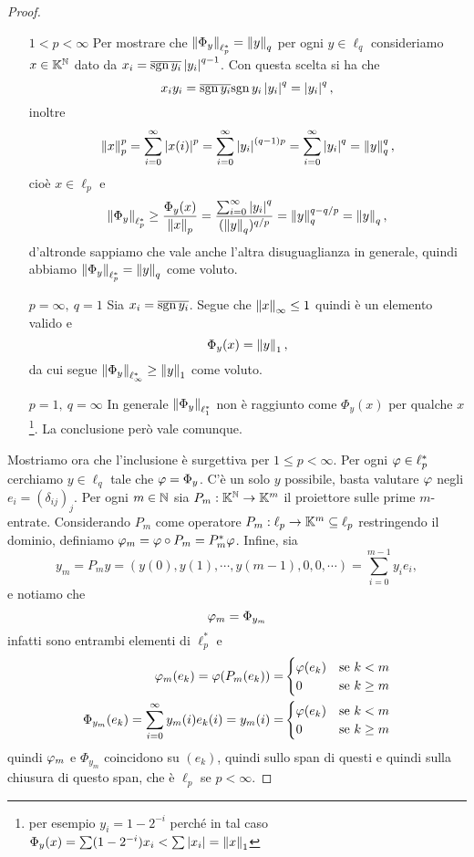 \begin{proof}
\setlength{\leftmargini}{0cm}
\begin{itemize}
\item[$\boxed{1< p<\infty}$] Per mostrare che $\left\Vert{\Phi_y}\right\Vert_{\ell_p^\ast}=\left\Vert{y}\right\Vert_q$ per ogni $y\in \ell_q$ consideriamo $x\in\mathbb{K}^{\mathbb{N}}$ dato da $x_i=\overline{\operatorname{sgn} y_i}\left|{y_i}\right|^{q-1}$. Con questa scelta si ha che
\[x_iy_i=\overline{\operatorname{sgn} y_i}{\operatorname{sgn} y_i}\left|{y_i}\right|^q=\left|{y_i}\right|^q,\]
inoltre
\[\left\Vert{x}\right\Vert_p^p=\sum_{i=0}^\infty \left|{x(i)}\right|^p=\sum_{i=0}^\infty \left|{y_i}\right|^{(q-1)p}=\sum_{i=0}^\infty \left|{y_i}\right|^{q}=\left\Vert{y}\right\Vert_q^q,\]
cio\`e $x\in \ell_p$ e 
\[\left\Vert{\Phi_y}\right\Vert_{\ell_p^\ast}\geq \frac{\Phi_y(x)}{\left\Vert{x}\right\Vert_p}=\frac{\sum_{i=0}^\infty \left|{y_i}\right|^q}{(\left\Vert{y}\right\Vert_q)^{q/p}}=\left\Vert{y}\right\Vert_q^{q-q/p}=\left\Vert{y}\right\Vert_q,\]
d'altronde sappiamo che vale anche l'altra disuguaglianza in generale, quindi abbiamo $\left\Vert{\Phi_y}\right\Vert_{\ell_p^\ast}=\left\Vert{y}\right\Vert_q$ come voluto.
\item[$\boxed{p=\infty,\ q=1}$] Sia $x_i=\overline{\operatorname{sgn} y_i}$. Segue che $\left\Vert{x}\right\Vert_\infty\leq 1$ quindi \`e un elemento valido e
\[\Phi_y(x)=\left\Vert{y}\right\Vert_1,\]
da cui segue $\left\Vert{\Phi_y}\right\Vert_{\ell_\infty^\ast}\geq \left\Vert{y}\right\Vert_1$ come voluto.
\item[$\boxed{p=1,\ q=\infty}$] In generale $\left\Vert{\Phi_y}\right\Vert_{\ell_1^\ast}$ non \`e raggiunto come $\Phi_y(x)$ per qualche $x$ \footnote{per esempio $y_i=1-2^{-i}$ perch\'e in tal caso $\Phi_y(x)=\sum (1-2^{-i})x_i<\sum \left|{x_i}\right|=\left\Vert{x}\right\Vert_1$}. La conclusione per\`o vale comunque.
\end{itemize}
Mostriamo ora che l'inclusione \`e surgettiva per $1\leq p<\infty$. Per ogni $\varphi\in \ell_p^\ast$ cerchiamo $y\in\ell_q$ tale che $\varphi=\Phi_y$. C'\`e un solo $y$ possibile, basta valutare $\varphi$ negli $e_i=(\delta_{ij})_j$. Per ogni $m\in\mathbb{N}$ sia $P_m:\mathbb{K}^{\mathbb{N}}\to \mathbb{K}^m$ il proiettore sulle prime $m$-entrate. Considerando $P_m$ come operatore $P_m:\ell_p\to\mathbb{K}^m\subseteq \ell_p$ restringendo il dominio, definiamo $\varphi_m=\varphi\circ P_m=P_m^\ast\varphi$. Infine, sia 
\[y_m=P_m y=(y(0),y(1),\cdots, y(m-1), 0,0,\cdots)=\sum_{i=0}^{m-1}y_ie_i,\] 
e notiamo che
\[\varphi_m=\Phi_{y_m}\]
infatti sono entrambi elementi di $\ell_p^\ast$ e 
\begin{align*}
    \varphi_m(e_k)=\varphi(P_m(e_k))=&\begin{cases}
        \varphi(e_k) &\text{se }k<m\\
        0 &\text{se }k\geq m
        \end{cases}\\
    \Phi_{y_m}(e_k)=\sum_{i=0}^\infty y_m(i)e_k(i)=y_m(i)=&\begin{cases}
        \varphi(e_k) &\text{se }k<m\\
        0 &\text{se }k\geq m
        \end{cases}
\end{align*}
quindi $\varphi_m$ e $\Phi_{y_m}$ coincidono su $(e_k)$, quindi sullo span di questi e quindi sulla chiusura di questo span, che \`e $\ell_p$ se $p<\infty$.


\end{proof}
